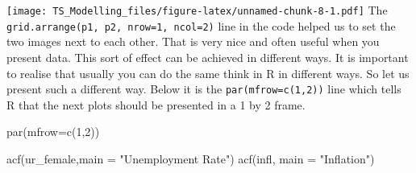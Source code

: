 \documentclass[
]{article}
\newenvironment{Shaded}{\begin{snugshade}}{\end{snugshade}}
\newcommand{\AttributeTok}[1]{\textcolor[rgb]{0.77,0.63,0.00}{#1}}
\newcommand{\DecValTok}[1]{\textcolor[rgb]{0.00,0.00,0.81}{#1}}
\newcommand{\FloatTok}[1]{\textcolor[rgb]{0.00,0.00,0.81}{#1}}
\newcommand{\FunctionTok}[1]{\textcolor[rgb]{0.00,0.00,0.00}{#1}}
\newcommand{\NormalTok}[1]{#1}
\newcommand{\OtherTok}[1]{\textcolor[rgb]{0.56,0.35,0.01}{#1}}
\newcommand{\SpecialCharTok}[1]{\textcolor[rgb]{0.00,0.00,0.00}{#1}}
\newcommand{\StringTok}[1]{\textcolor[rgb]{0.31,0.60,0.02}{#1}}
\begin{document}
\begin{Shaded}
\end{Shaded}

\texttt{[image: TS\_Modelling\_files/figure-latex/unnamed-chunk-8-1.pdf]}
The \texttt{grid.arrange(p1,\ p2,\ nrow=1,\ ncol=2)} line in the code
helped us to set the two images next to each other. That is very nice
and often useful when you present data. This sort of effect can be
achieved in different ways. It is important to realise that usually you
can do the same think in R in different ways. So let us present such a
different way. Below it is the \texttt{par(mfrow=c(1,2))} line which
tells R that the next plots should be presented in a 1 by 2 frame.

\begin{Shaded}
\begin{Highlighting}[]
\FunctionTok{par}\NormalTok{(}\AttributeTok{mfrow=}\FunctionTok{c}\NormalTok{(}\DecValTok{1}\NormalTok{,}\DecValTok{2}\NormalTok{))}

\FunctionTok{acf}\NormalTok{(ur\_female,}\AttributeTok{main =} \StringTok{"Unemployment Rate"}\NormalTok{)}
\FunctionTok{acf}\NormalTok{(infl, }\AttributeTok{main =} \StringTok{"Inflation"}\NormalTok{)}
\end{Highlighting}
\end{Shaded}
\end{document}
